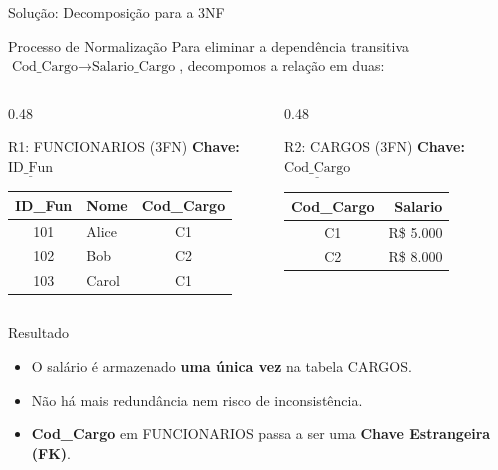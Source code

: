 \documentclass[9pt]{beamer}
\begin{document}
\begin{frame}{Solução: Decomposição para a 3NF}
\small

\begin{block}{Processo de Normalização}
Para eliminar a dependência transitiva $\text{Cod\_Cargo} \to \text{Salario\_Cargo}$, decompomos a relação em duas:
\end{block}

\vspace{0.3cm}

\begin{columns}[t]
    \begin{column}{0.48\textwidth}
        \begin{exampleblock}{R1: FUNCIONARIOS (3FN)}
        \textbf{Chave:} $\underline{\text{ID\_Fun}}$

        \centering
        \vspace{0.1cm}
        \begin{tabular}{|c|l|c|}
        \hline
        \textbf{ID\_Fun} & \textbf{Nome} & \textbf{Cod\_Cargo} \\ \hline
        101 & Alice & C1 \\ \hline
        102 & Bob   & C2 \\ \hline
        103 & Carol & C1 \\ \hline
        \end{tabular}
        \end{exampleblock}
    \end{column}

    \begin{column}{0.48\textwidth}
        \begin{exampleblock}{R2: CARGOS (3FN)}
        \textbf{Chave:} $\underline{\text{Cod\_Cargo}}$

        \centering
        \vspace{0.1cm}
        \begin{tabular}{|c|r|}
        \hline
        \textbf{Cod\_Cargo} & \textbf{Salario} \\ \hline
        C1 & R\$ 5.000 \\ \hline
        C2 & R\$ 8.000 \\ \hline
        \end{tabular}
        \end{exampleblock}
    \end{column}
\end{columns}

\vspace{0.4cm}

\begin{block}{Resultado}
\begin{itemize}
  \item O salário é armazenado \textbf{uma única vez} na tabela CARGOS.
  \item Não há mais redundância nem risco de inconsistência.
  \item \textbf{Cod\_Cargo} em FUNCIONARIOS passa a ser uma \textbf{Chave Estrangeira (FK)}.
\end{itemize}
\end{block}
\end{frame}
\end{document}
